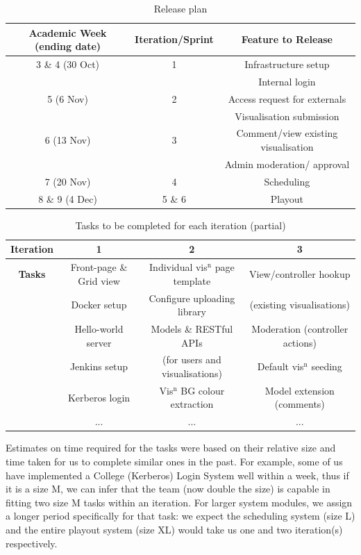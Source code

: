 \documentclass[a4paper, titlepage]{article}
\begin{document}
\begin{table}[h]
  \begin{center}
  \begin{tabular}{c | c | c}
     \textbf{Academic Week (ending date)} & \textbf{Iteration/Sprint} & \textbf{Feature to Release} \\ \hline
     3 \& 4 (30 Oct) & 1 & Infrastructure setup \\
      & & Internal login \\
     5 (6 Nov) & 2 & Access request for externals \\
      & & Visualisation submission \\
     6 (13 Nov) & 3 & Comment/view existing visualisation \\
      & & Admin moderation/ approval \\
     7 (20 Nov) & 4 & Scheduling \\
     8 \& 9 (4 Dec) & 5 \& 6 & Playout \\
  \end{tabular}
  \end{center}
  \caption{Release plan}
  \label{tab:projman_rplan}
\end{table}

\begin{table}[h]
  \begin{tabular}{c | c | c | c }
    \textbf{Iteration} & 1 & 2 & 3 \\ \hline
   \textbf{Tasks} & Front-page \& Grid view & Individual vis$^\textrm{n}$ page template & View/controller hookup\\
      & Docker setup & Configure uploading library & (existing visualisations)\\
      & Hello-world server & Models \& RESTful APIs& Moderation (controller actions)\\
      & Jenkins setup & (for users and visualisations)& Default vis$^\textrm{n}$ seeding\\
      & Kerberos login& Vis$^\textrm{n}$ BG colour extraction & Model extension (comments)\\
      & ... & ... & ...
  \end{tabular}
  \caption{Tasks to be completed for each iteration (partial)}
  \label{tab:projman_iplan}
\end{table}


Estimates on time required for the tasks were based on their relative size and
time taken for us to complete similar ones in the past. For example, some of us
have implemented a College (Kerberos) Login System well within a week, thus if
it is a size M, we can infer that the team (now double the size) is capable in 
fitting two size M tasks within an iteration. For larger system modules, we
assign a longer period specifically for that task: we expect the scheduling
system (size L) and the entire playout system (size XL) would take us one and
two iteration(s) respectively.
\end{document}
